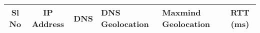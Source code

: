 \documentclass[12pt]{article}
\begin{document}
\begin{enumerate}
\begin{table}[h!]
{\begin{tabular}{|c|c|>{\centering\arraybackslash}m{}|>{\centering\arraybackslash}m{}|>{\centering\arraybackslash}m{}|c|}
            \hline
            \textbf{Sl No} & \textbf{IP Address} & \textbf{DNS} & \textbf{DNS Geolocation} & \textbf{Maxmind Geolocation} & \textbf{RTT} (ms) \\
            \hline


\end{tabular}}
\end{table}
\end{enumerate}
\end{document}
